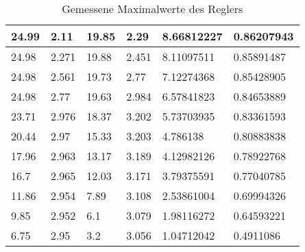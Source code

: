 \begin{table}[h]
\begin{tabular}{|l|l|l|l|l|l|}
24.99                         & 2.11                         & 19.85                         & 2.29                          & 8.66812227                            & 0.86207943                     \\ \hline
24.98                         & 2.271                        & 19.88                         & 2.451                         & 8.11097511                            & 0.85891487                     \\ \hline
24.98                         & 2.561                        & 19.73                         & 2.77                          & 7.12274368                            & 0.85428905                     \\ \hline
24.98                         & 2.77                         & 19.63                         & 2.984                         & 6.57841823                            & 0.84653889                     \\ \hline
23.71                         & 2.976                        & 18.37                         & 3.202                         & 5.73703935                            & 0.83361593                     \\ \hline
20.44                         & 2.97                         & 15.33                         & 3.203                         & 4.786138                              & 0.80883838                     \\ \hline
17.96                         & 2.963                        & 13.17                         & 3.189                         & 4.12982126                            & 0.78922768                     \\ \hline
16.7                          & 2.965                        & 12.03                         & 3.171                         & 3.79375591                            & 0.77040785                     \\ \hline
11.86                         & 2.954                        & 7.89                          & 3.108                         & 2.53861004                            & 0.69994326                     \\ \hline
9.85                          & 2.952                        & 6.1                           & 3.079                         & 1.98116272                            & 0.64593221                     \\ \hline
6.75                          & 2.95                         & 3.2                           & 3.056                         & 1.04712042                            & 0.4911086                      \\ \hline
\end{tabular}
\caption{Gemessene Maximalwerte des Reglers}
\label{fig::maxValues}
\end{table}

